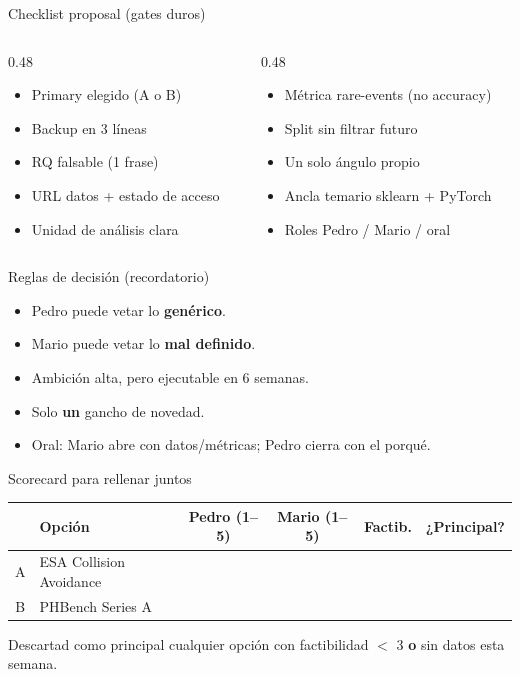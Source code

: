 \documentclass[aspectratio=169,10pt]{beamer}
\begin{document}
\begin{frame}{Checklist proposal (gates duros)}
  \begin{columns}[T]
    \begin{column}{0.48\textwidth}
      \begin{itemize}
        \item Primary elegido (A o B)
        \item Backup en 3 líneas
        \item RQ falsable (1 frase)
        \item URL datos + estado de acceso
        \item Unidad de análisis clara
      \end{itemize}
    \end{column}
    \begin{column}{0.48\textwidth}
      \begin{itemize}
        \item Métrica rare-events (no accuracy)
        \item Split sin filtrar futuro
        \item Un solo ángulo propio
        \item Ancla temario sklearn + PyTorch
        \item Roles Pedro / Mario / oral
      \end{itemize}
    \end{column}
  \end{columns}
\end{frame}

\begin{frame}{Reglas de decisión (recordatorio)}
  \begin{itemize}
    \item Pedro puede vetar lo \textbf{genérico}.
    \item Mario puede vetar lo \textbf{mal definido}.
    \item Ambición alta, pero ejecutable en 6 semanas.
    \item Solo \textbf{un} gancho de novedad.
    \item Oral: Mario abre con datos/métricas; Pedro cierra con el porqué.
  \end{itemize}
\end{frame}

\begin{frame}{Scorecard para rellenar juntos}
  \tiny
  \renewcommand{\arraystretch}{1.35}
  \begin{tabular}{@{}clcccc@{}}
    \toprule
    & Opción & Pedro (1--5) & Mario (1--5) & Factib. & ¿Principal? \\
    \midrule
    A & ESA Collision Avoidance & & & & \\
    B & PHBench Series A & & & & \\
    \bottomrule
  \end{tabular}
  \vspace{0.55em}
  \normalsize
  Descartad como principal cualquier opción con factibilidad $<$ 3 \textbf{o} sin datos esta semana.
\end{frame}
\end{document}
